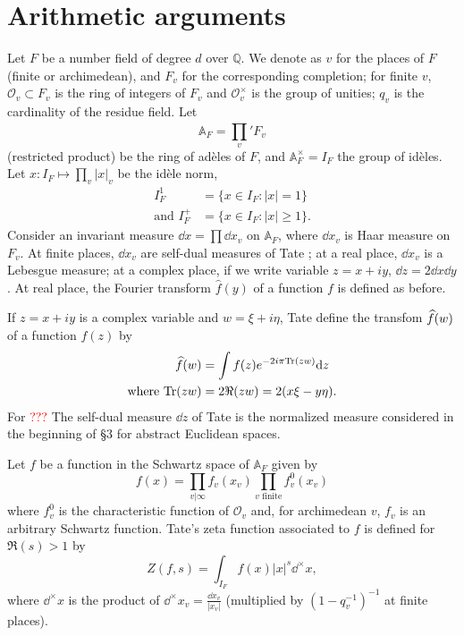 \section{Arithmetic arguments}

Let $F$ be a number field of degree $d$ over $\mathbb{Q}$.
We denote as $v$ for the places of $F$ (finite or archimedean), and $F_{v}$ for the corresponding completion; for finite $v$, $\mathcal{O}_{v} \subset F_{v}$ is the ring of integers of $F_{v}$ and $\mathcal{O}_{v}^\times$ is the group of unities; $q_{v}$ is the cardinality of the residue field.
Let
\[
    \mathbb{A}_{F} = \prod_{v}^{}{}' F_{v}
\]
(restricted product) be the ring of ad\`eles of $F$, and $\mathbb{A}_{F}^\times = I_{F}$ the group of id\`eles.
Let $x: I_{F} \mapsto \prod_{v} |x|_{v}$ be the id\`ele norm,
\begin{align*}
    I_F^{1} &= \{ x \in I_F: |x| = 1\} \\
    \text{and }I_{F}^{+} &= \{ x \in I_F: |x| \geq 1\}.
\end{align*}
Consider an invariant measure $\dd x = \prod \dd x_v$ on $\mathbb{A}_F$, where $\dd x_v$ is Haar measure on $F_v$.
At finite places, $\dd x_v$ are self-dual measures of Tate \cite{tate1967fourier}; at a real place, $\dd x_v$ is a Lebesgue measure; at a complex place, if we write variable $z = x + iy$, $\dd z =2 \dd x \dd y$.
At real place, the Fourier transform $\hat{f}(y)$ of a function $f$ is defined as before.

If $z = x + iy$ is a complex variable and $w = \xi + i \eta$, Tate define the transfom $\widehat{f}(w)$ of a function $f(z)$ by
\begin{align*}
    \widehat{f}(w) &= \int f(z) e^{-2 i \pi \mathrm{Tr}(zw)} \mathrm{d} z \\
    \text{where } \mathrm{Tr}(zw) &= 2 \Re(zw) = 2(x \xi - y \eta).
\end{align*}
For \textcolor{red}{???}
The self-dual measure $\dd z$ of Tate is the normalized measure considered in the beginning of \S 3 for abstract Euclidean spaces.

Let $f$ be a function in the Schwartz space of $\mathbb{A}_F$ given by
\begin{equation}
    \label{eqn:4.1}
    f(x) = \prod_{v|\infty} f_{v}(x_{v}) \prod_{v\text{ finite}} f_{v}^{0}(x_{v})
\end{equation}
where $f_{v}^{0}$ is the characteristic function of $\mathcal{O}_{v}$ and, for archimedean $v$, $f_{v}$ is an arbitrary Schwartz function.
Tate's zeta function associated to $f$ is defined for $\Re(s) > 1$ by
\[
    Z(f, s) = \int_{I_F} f(x) |x|^{s} \dd^\times x,
\]
where $\dd^\times x$ is the product of $\dd^\times x_v = \frac{\dd x_v}{|x_v|}$ (multiplied by $(1 - q_{v}^{-1})^{-1}$ at finite places).

